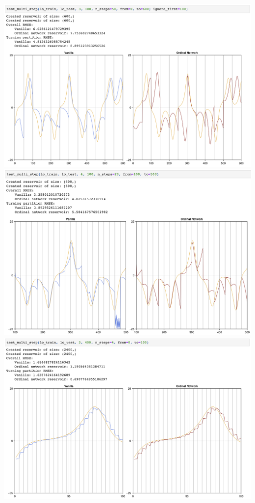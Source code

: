 \documentclass[a4paper,12pt]{article}
\begin{document}
\includegraphics[width=\textwidth]{figure_1.png}
\includegraphics[width=\textwidth]{figure_2.png}
\includegraphics[width=\textwidth]{figure_3.png}
\end{document}
